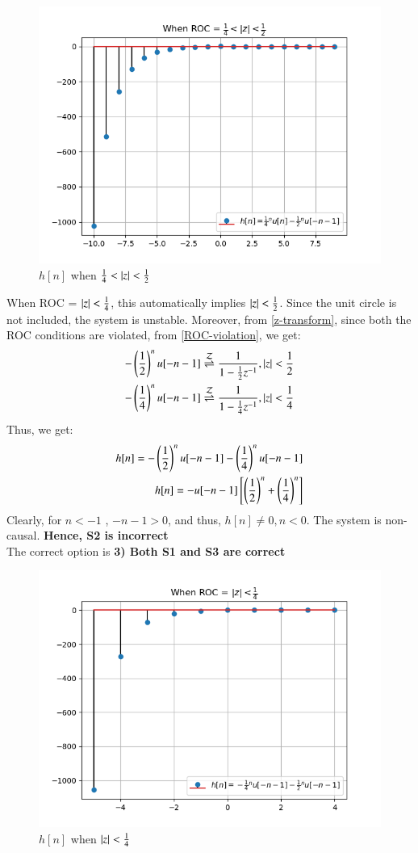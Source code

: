 \documentclass[journal,12pt,twocolumn]{IEEEtran}
\begin{document}
   \begin{figure}[!ht]
\centering
 \includegraphics[width=\columnwidth]{Graphs/S3.png}
 \caption{$h[n]$ when $\frac{1}{4}<\left\vert z\right\vert < \frac{1}{2}$}
 \end{figure}

When ROC = $\left\vert z\right\vert < \frac{1}{4}$, this automatically implies $\left\vert z\right\vert < \frac{1}{2}$. Since the unit circle is not included, the system is unstable. Moreover, from \eqref{z-transform}, since both the ROC conditions are violated, from \eqref{ROC-violation}, we get:
\begin{align}
    -\left(\frac{1}{2}\right)^nu[-n-1] \overset{\mathcal{Z}}{ \rightleftharpoons} \frac{1}{1 - \frac{1}{2}z^{-1}} , \left\vert z\right\vert < \frac{1}{2}\\
    -\left(\frac{1}{4}\right)^nu[-n-1] \overset{\mathcal{Z}}{ \rightleftharpoons} \frac{1}{1 - \frac{1}{4}z^{-1}} , \left\vert z\right\vert < \frac{1}{4}
\end{align}
Thus, we get:
\begin{align}
    h[n] = -\left(\frac{1}{2}\right)^nu[-n-1] -\left(\frac{1}{4}\right)^nu[-n-1]\\
    h[n] = -u[-n-1]{}\left[\left(\frac{1}{2}\right)^n + \left(\frac{1}{4}\right)^n\right]
\end{align}
Clearly, for $n<-1$ , $-n-1 > 0$, and thus, $h[n] \neq 0 , n<0$. The system is non-causal.
\textbf{Hence, S2 is incorrect}\\
 The correct option is \textbf{3) Both S1 and S3 are correct}

  \begin{figure}[!ht]
\centering
 \includegraphics[width=\columnwidth]{Graphs/S2.png}
 \caption{$h[n]$ when $\left\vert z\right\vert < \frac{1}{4}$} \end{figure}
 
\end{document}
